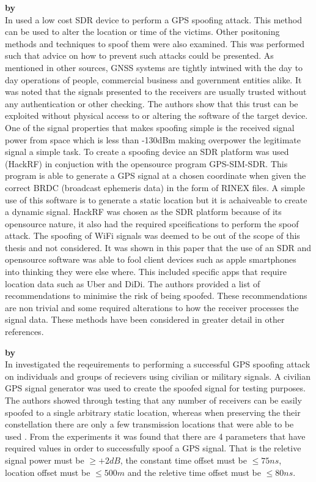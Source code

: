 \textbf{\emph{} by \citeauthor{RN28}} \\
In \citeyear{RN28} \citeauthor{RN28} \cite{RN28} used a low cost SDR device to perform a GPS spoofing attack. This method can be used to alter the location or time
of the victims. Other positoning methods and techniques to spoof them were also examined. This was performed such that advice on how to prevent such attacks could be 
presented. As mentioned in other sources, GNSS systems are tightly intwined with the day to day operations of people, commercial business and government entities alike.
It was noted that the signals presented to the receivers are usually trusted without any authentication or other checking. The authors show that this trust can be exploited
without physical access to or altering the software of the target device. One of the signal properties that makes spoofing simple is the received signal power from space
which is less than -130dBm making overpower the legitimate signal a simple task. 
To create a spoofing device an SDR platform was used (HackRF) in conjuction with the opensource program GPS-SIM-SDR. This program is able to generate a GPS signal
at a chosen coordinate when given the correct BRDC (broadcast ephemeris data) in the form of RINEX files. A simple use of this software is to generate a static location
but it is achaiveable to create a dynamic signal. HackRF was chosen as the SDR platform because of its opensource nature, it also had the required spceifications to
perform the spoof attack. The spoofing of WiFi signals was deemed to be out of the scope of this thesis and not considered.
It was shown in this paper that the use of an SDR and opensource software was able to fool client devices such as apple smartphones into thinking they were else where.
This included specific apps that require location data such as Uber and DiDi. The authors provided a list of recommendations to minimise the risk of being spoofed. 
These recommendations are non trivial and some required alterations to how the receiver processes the signal data. These methods have been considered in greater
detail in other references.

\medskip

\textbf{\emph{} by \citeauthor{RN30}} \\
In \citeyear{RN30} \citeauthor{RN30} \cite{RN30} investigated the reqeuirements to performing a successful GPS spoofing attack on individuals and groups of recievers
using civilian or military signals. A civilian GPS signal generator was used to create the spoofed signal for testing purposes.
The authors showed through testing that any number of receivers can be easily spoofed to a single arbitrary static location, whereas
when preserving the their constellation there are only a few transmission locations that were able to be used .
From the experiments it was found that there are 4 parameters that have required values in order to successfully spoof a GPS signal. That is the reletive signal 
power must be $\geq+2dB$, the constant time offset must be $\leq 75ns$, location offset must be $\leq 500m$ and the reletive time offset must be $\leq 80ns$.


